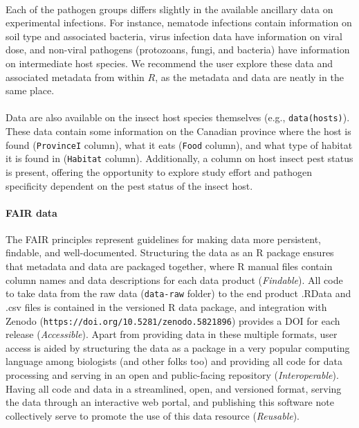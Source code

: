 \documentclass[12pt]{article}
\begin{document}
\paragraph*{}
Each of the pathogen groups differs slightly in the available ancillary data on experimental infections. For instance, nematode infections contain information on soil type and associated bacteria, virus infection data have information on viral dose, and non-viral pathogens (protozoans, fungi, and bacteria) have information on intermediate host species. We recommend the user explore these data and associated metadata from within $R$, as the metadata and data are neatly in the same place. 



\paragraph*{}
Data are also available on the insect host species themselves (e.g., \texttt{data(hosts)}). These data contain some information on the Canadian province where the host is found (\texttt{ProvinceI} column), what it eats (\texttt{Food} column), and what type of habitat it is found in (\texttt{Habitat} column). Additionally, a column on host insect pest status is present, offering the opportunity to explore study effort and pathogen specificity dependent on the pest status of the insect host. 




\paragraph*{FAIR data}
The FAIR principles represent guidelines for making data more persistent, findable, and well-documented. Structuring the data as an R package ensures that metadata and data are packaged together, where R manual files contain column names and data descriptions for each data product (\textit{Findable}). All code to take data from the raw data (\texttt{data-raw} folder) to the end product .RData and .csv files is contained in the versioned R data package, and integration with Zenodo (\texttt{https://doi.org/10.5281/zenodo.5821896}) provides a DOI for each release (\textit{Accessible}). Apart from providing data in these multiple formats, user access is aided by structuring the data as a package in a very popular computing language among biologists (and other folks too) and providing all code for data processing and serving in an open and public-facing repository (\textit{Interoperable}). Having all code and data in a streamlined, open, and versioned format, serving the data through an interactive web portal, and publishing this software note collectively serve to promote the use of this data resource (\textit{Reusable}).
\end{document}
